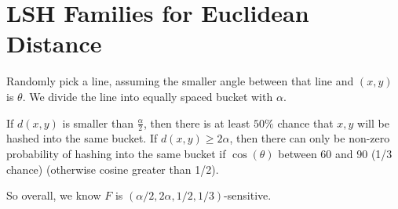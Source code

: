 \section{LSH Families for Euclidean Distance} 
Randomly pick a line, assuming the smaller angle between that line and $(x,y)$ is $\theta$. We divide the line into equally spaced bucket with $\alpha$. 

If $d(x,y)$ is smaller than $\frac{\alpha}{2}$, then there is at least $50 \%$ chance that $x,y$ will be hashed into the same bucket. If $d(x,y) \geq 2\alpha$, then there can only be non-zero probability of hashing into the same bucket if $\cos(\theta)$ between 60 and 90 (1/3 chance) (otherwise cosine greater than 1/2). 

So overall, we know $F$ is $(\alpha/2, 2\alpha, 1/2, 1/3)$-sensitive. 





